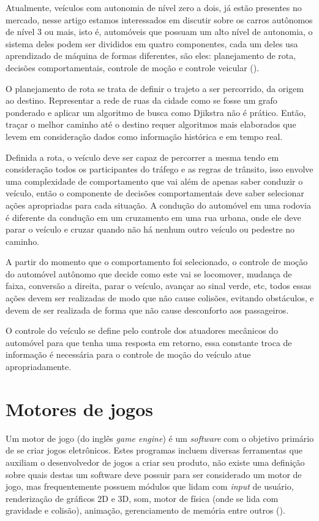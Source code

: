 Atualmente, veículos com autonomia de nível zero a dois, já estão presentes no mercado, nesse artigo estamos interessados em discutir sobre os carros autônomos de nível 3 ou mais, isto é, automóveis que possuam um alto nível de autonomia, o sistema deles podem ser divididos em quatro componentes, cada um deles usa aprendizado de máquina de formas diferentes, são eles: planejamento de rota, decisões comportamentais, controle de moção e controle veicular (). 

O planejamento de rota se trata de definir o trajeto a ser percorrido, da origem ao destino. Representar a rede de ruas da cidade como se fosse um grafo ponderado e aplicar um algoritmo de busca como Djikstra não é prático. Então, traçar o melhor caminho até o destino requer algoritmos mais elaborados que levem em consideração dados como informação histórica e em tempo real.

Definida a rota, o veículo deve ser capaz de percorrer a mesma tendo em consideração todos os participantes do tráfego e as regras de trânsito, isso envolve uma complexidade de comportamento que vai além de apenas saber conduzir o veículo, então o componente de decisões comportamentais deve saber selecionar ações apropriadas para cada situação. A condução do automóvel em uma rodovia é diferente da condução em um cruzamento em uma rua urbana, onde ele deve parar o veículo e cruzar quando não há nenhum outro veículo ou pedestre no caminho.

A partir do momento que o comportamento foi selecionado, o controle de moção do automóvel autônomo que decide como este vai se locomover, mudança de faixa, conversão a direita, parar o veículo, avançar ao sinal verde, etc, todos essas ações devem ser realizadas de modo que não cause colisões, evitando obstáculos, e devem de ser realizada de forma que não cause desconforto aos passageiros.

O controle do veículo se define pelo controle dos atuadores mecânicos do automóvel para que tenha uma resposta em retorno, essa constante troca de informação é necessária para o controle de moção do veículo atue apropriadamente.

\section{Motores de jogos}
Um motor de jogo (do inglês \textit{game engine}) é um \textit{software} com o objetivo primário de se criar jogos eletrônicos. Estes programas incluem diversas ferramentas que auxiliam o desenvolvedor de jogos a criar seu produto, não existe uma definição sobre quais destas um software deve possuir para ser considerado um motor de jogo, mas frequentemente possuem módulos que lidam com \textit{input} de usuário, renderização de gráficos 2D e 3D, som, motor de física (onde se lida com gravidade e colisão), animação, gerenciamento de memória entre outros (). 

